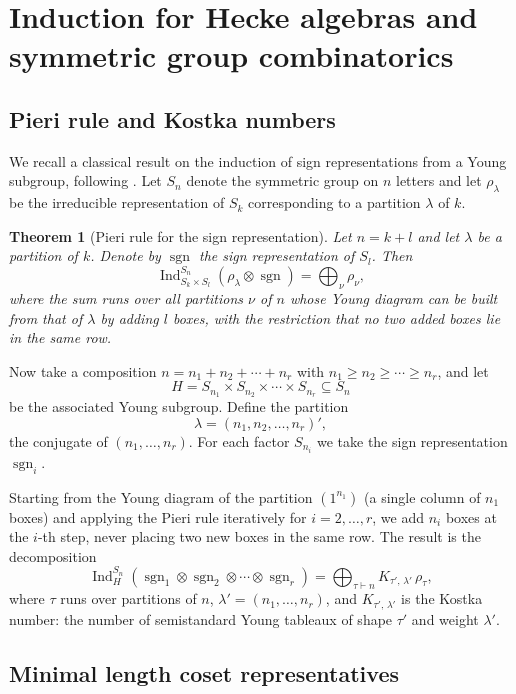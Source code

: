\documentclass[12pt]{article}
\newtheorem{theorem}{Theorem}[section]
\theoremstyle{remark}
\begin{document}
\section{Induction for Hecke algebras and symmetric group combinatorics}
\subsection{Pieri rule and Kostka numbers}

We recall a classical result on the induction of sign representations from a Young subgroup, following \cite[Section 6.6.3]{GeckPfeiffer2000}. Let $S_n$ denote the symmetric group on $n$ letters and let $\rho_\lambda$ be the irreducible representation of $S_k$ corresponding to a partition $\lambda$ of $k$.

\begin{theorem}[Pieri rule for the sign representation]
Let $n = k + l$ and let $\lambda$ be a partition of $k$. Denote by $\operatorname{sgn}$ the sign representation of $S_l$. Then
\[
\operatorname{Ind}_{S_k \times S_l}^{S_n}(\rho_\lambda \otimes \operatorname{sgn}) = \bigoplus_{\nu} \rho_\nu,
\]
where the sum runs over all partitions $\nu$ of $n$ whose Young diagram can be built from that of $\lambda$ by adding $l$ boxes, with the restriction that no two added boxes lie in the same row.
\end{theorem}

Now take a composition $n = n_1 + n_2 + \cdots + n_r$ with $n_1 \ge n_2 \ge \cdots \ge n_r$, and let
\[
H = S_{n_1} \times S_{n_2} \times \cdots \times S_{n_r} \subseteq S_n
\]
be the associated Young subgroup. Define the partition
\[
\lambda = (n_1, n_2, \dots, n_r)',
\]
the conjugate of $(n_1,\dots,n_r)$. For each factor $S_{n_i}$ we take the sign representation $\operatorname{sgn}_i$.

Starting from the Young diagram of the partition $(1^{n_1})$ (a single column of $n_1$ boxes) and applying the Pieri rule iteratively for $i = 2, \dots, r$, we add $n_i$ boxes at the $i$-th step, never placing two new boxes in the same row. The result is the decomposition
\[
\operatorname{Ind}_H^{S_n}(\operatorname{sgn}_1 \otimes \operatorname{sgn}_2 \otimes \cdots \otimes \operatorname{sgn}_r) = \bigoplus_{\tau \vdash n} K_{\tau',\,\lambda'} \, \rho_\tau,
\]
where $\tau$ runs over partitions of $n$, $\lambda' = (n_1,\dots,n_r)$, and $K_{\tau',\,\lambda'}$ is the Kostka number: the number of semistandard Young tableaux of shape $\tau'$ and weight $\lambda'$. 

\subsection{Minimal length coset representatives}
\end{document}

